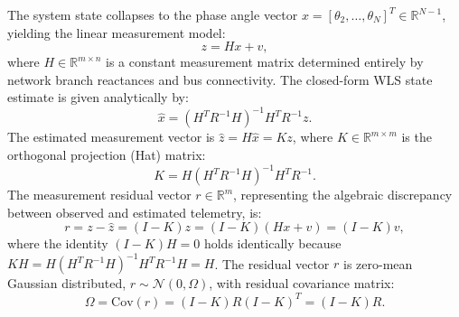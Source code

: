 \documentclass[journal,compsoc]{IEEEtran}
\begin{document}
The system state collapses to the phase angle vector $x = [\theta_2, \dots, \theta_N]^T \in \mathbb{R}^{N-1}$, yielding the linear measurement model:
\begin{equation}
    z = Hx + v,
\end{equation}
where $H \in \mathbb{R}^{m \times n}$ is a constant measurement matrix determined entirely by network branch reactances and bus connectivity. The closed-form WLS state estimate is given analytically by:
\begin{equation}
    \hat{x} = (H^T R^{-1} H)^{-1} H^T R^{-1} z.
\end{equation}
The estimated measurement vector is $\hat{z} = H\hat{x} = Kz$, where $K \in \mathbb{R}^{m \times m}$ is the orthogonal projection (Hat) matrix:
\begin{equation}
    K = H (H^T R^{-1} H)^{-1} H^T R^{-1}.
\end{equation}
The measurement residual vector $r \in \mathbb{R}^m$, representing the algebraic discrepancy between observed and estimated telemetry, is:
\begin{equation}
    r = z - \hat{z} = (I - K) z = (I - K) (Hx + v) = (I - K) v,
\end{equation}
where the identity $(I - K)H = 0$ holds identically because $KH = H(H^T R^{-1} H)^{-1} H^T R^{-1} H = H$. The residual vector $r$ is zero-mean Gaussian distributed, $r \sim \mathcal{N}(0, \Omega)$, with residual covariance matrix:
\begin{equation}
    \Omega = \text{Cov}(r) = (I - K) R (I - K)^T = (I - K) R.
\end{equation}
\end{document}
